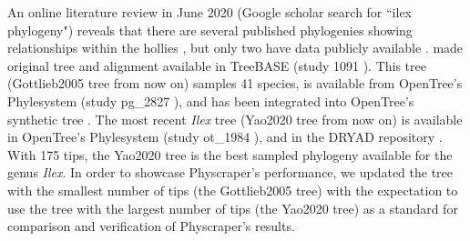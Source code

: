 \documentclass{bmcart}
\begin{document}
An online literature review in June 2020 (Google scholar search for ``ilex phylogeny")
reveals that there are several published phylogenies showing relationships within
the hollies \cite{cuenoud2000molecular, manen2010history, setoguchi2000intersectional,
selbach2009new}, but only two have data publicly available \cite{gottlieb2005molecular, yao2020phylogeny}.
\cite{gottlieb2005molecular} made original tree and alignment available in TreeBASE
(study 1091 \cite{treebase1091}). This tree (Gottlieb2005 tree from now on) samples 41 species, is available from
OpenTree's Phylesystem (study pg\_2827 \cite{pg2827}),
and has been integrated into OpenTree's synthetic tree \cite{mrcaott68451ott89474}.
The most recent \textit{Ilex} tree \cite{yao2020phylogeny} (Yao2020 tree from now on) is available in
OpenTree's Phylesystem (study ot\_1984 \cite{ot1984}),
and in the DRYAD repository \cite{yao2020dryad}.
With 175 tips, the Yao2020 tree \cite{yao2020phylogeny} is the best sampled phylogeny available for
the genus \textit{Ilex}.
In order to showcase Physcraper's performance, we updated
the tree with the smallest number of tips (the Gottlieb2005 tree) with the expectation
to use the tree with the largest number of tips (the Yao2020 tree) as a standard
for comparison and verification of Physcraper's results.
\end{document}
